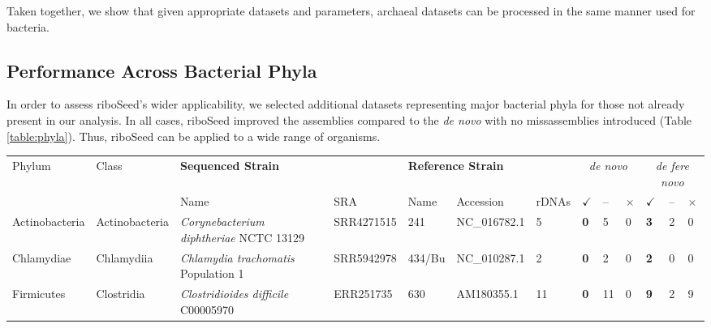 Taken together, we show that given appropriate datasets and parameters, archaeal datasets can be processed in the same manner used for bacteria.

\subsection*{Performance Across Bacterial Phyla}
In order to assess riboSeed's wider applicability, we selected additional datasets representing major bacterial phyla for those not already present in our analysis. In all cases, riboSeed improved the assemblies compared to the \textit{de novo} with no missassemblies introduced (Table \ref{table:phyla}). Thus, riboSeed can be applied to a wide range of organisms.

\begin{sidewaystable}[!hb]
  \centering
  \caption{Comparison of \textit{de novo} and riboSeed's \textit{de fere novo} assemblies}
  \label{table:phyla}
  \begin{tabular}{p{2.25cm}p{2.65cm}p{5.75cm}p{1.75cm}p{2.25cm}p{1.95cm}p{.6cm}>{\hfill}p{.4cm}p{.2cm}p{.1cm}>{\hfill}p{.4cm}p{.2cm}p{.1cm}}
    \toprule
    \multirow{2}{*}{Phylum} & \multirow{2}{*}{Class}  & \multicolumn{2}{l}{\textbf{Sequenced Strain}}  &  \multicolumn{3}{l}{\textbf{Reference Strain}} &  \multicolumn{3}{c}{\textit{de novo}} & \multicolumn{3}{c}{\textit{de fere novo}} \\
    & & Name & SRA & Name & Accession & rDNAs & \textbf{$\checkmark$} & -- & $\times$ & \textbf{$\checkmark$} & -- & $\times$  \\
    \toprule
    Actinobacteria & Actinobacteria        & \textit{Corynebacterium  diphtheriae}   NCTC 13129      & SRR4271515 & 241 &  NC\_016782.1      & 5  & \textbf{0} & 5  & 0 & \textbf{3} & 2 & 0 \\
    Chlamydiae     & Chlamydiia            & \textit{Chlamydia        trachomatis}  Population 1 & SRR5942978 & 434/Bu & NC\_010287.1     & 2  & \textbf{0} & 2  & 0 & \textbf{2} & 0 & 0 \\
    Firmicutes     & Clostridia            & \textit{Clostridioides   difficile}    C00005970                                             & ERR251735  & 630  &AM180355.1       & 11 & \textbf{0} & 11 & 0 & \textbf{9} & 2 & 9 \\

\end{tabular}
\end{sidewaystable}
